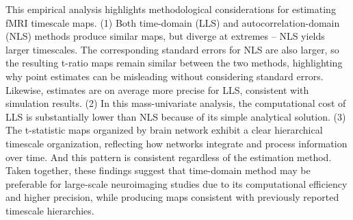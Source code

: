 \documentclass[latex/main.tex]{subfiles}
\begin{document}
This empirical analysis highlights methodological considerations for estimating fMRI timescale maps. (1) Both time-domain (LLS) and autocorrelation-domain (NLS) methods produce similar maps, but diverge at extremes -- NLS yields larger timescales. The corresponding standard errors for NLS are also larger, so the resulting t-ratio maps remain similar between the two methods, highlighting why point estimates can be misleading without considering standard errors.  Likewise, estimates are on average more precise for LLS, consistent with simulation results.  (2) In this mass-univariate analysis, the computational cost of LLS is substantially lower than NLS because of its simple analytical solution. (3) The t-statistic maps organized by brain network exhibit a clear hierarchical timescale organization, reflecting how networks integrate and process information over time. And this pattern is consistent regardless of the estimation method. Taken together, these findings suggest that time-domain method may be preferable for large-scale neuroimaging studies due to its computational efficiency and higher precision, while producing maps consistent with previously reported timescale hierarchies. 
\end{document}
